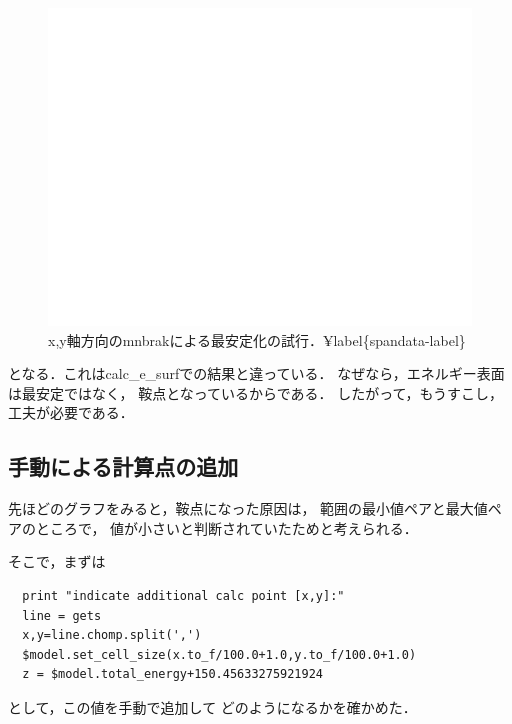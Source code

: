 \begin{figure}[H][htbp]
\centering
\begin{center}
\includegraphics[width=150mm]{../.././figs/thesis/thesis_008.jpeg}
\end{center}
\caption{x,y軸方向のmnbrakによる最安定化の試行．¥label\{spandata-label\}}

\label{fig:}
\end{figure}

となる．これはcalc\_e\_surfでの結果と違っている．
なぜなら，エネルギー表面は最安定ではなく， 鞍点となっているからである．
したがって，もうすこし，工夫が必要である．

    \subsection{手動による計算点の追加}\label{ux624bux52d5ux306bux3088ux308bux8a08ux7b97ux70b9ux306eux8ffdux52a0}

先ほどのグラフをみると，鞍点になった原因は，
範囲の最小値ペアと最大値ペアのところで，
値が小さいと判断されていたためと考えられる．

そこで，まずは

\begin{verbatim}
  print "indicate additional calc point [x,y]:"
  line = gets
  x,y=line.chomp.split(',')
  $model.set_cell_size(x.to_f/100.0+1.0,y.to_f/100.0+1.0)
  z = $model.total_energy+150.45633275921924
\end{verbatim}

として，この値を手動で追加して どのようになるかを確かめた．

